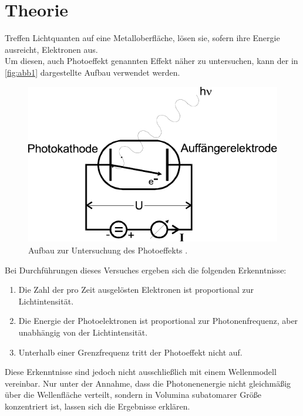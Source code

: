 \section{Theorie}
\label{sec:theorie}

Treffen Lichtquanten auf eine Metalloberfläche,
lösen sie, sofern ihre Energie ausreicht, Elektronen aus. \\

Um diesen, auch Photoeffekt genannten Effekt näher zu untersuchen,
kann der in \autoref{fig:abb1} dargestellte Aufbau verwendet werden.

\begin{figure}[H]
    \centering
    \includegraphics{figures/Abb1.pdf}
    \caption{Aufbau zur Untersuchung des Photoeffekts \cite{ap10}.}
    \label{fig:abb1}
\end{figure}

Bei Durchführungen dieses Versuches ergeben sich die folgenden Erkenntnisse:

\begin{enumerate}
    \item Die Zahl der pro Zeit ausgelösten Elektronen ist proportional zur Lichtintensität.
    \item Die Energie der Photoelektronen ist proportional zur Photonenfrequenz, aber unabhängig von der Lichtintensität.
    \item Unterhalb einer Grenzfrequenz tritt der Photoeffekt nicht auf.
\end{enumerate}

Diese Erkenntnisse sind jedoch nicht ausschließlich mit einem Wellenmodell vereinbar.
Nur unter der Annahme, dass die Photonenenergie nicht gleichmäßig über die Wellenfläche verteilt,
sondern in Volumina subatomarer Größe konzentriert ist, lassen sich die Ergebnisse erklären. \\

